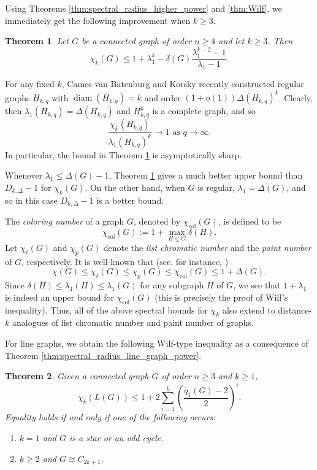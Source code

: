 \documentclass[11pt]{article}
\theoremstyle{plain}
\newtheorem{theorem}{Theorem}[section]
\numberwithin{equation}{section}
\DeclareMathOperator{\diam}{diam}
\DeclareMathOperator{\col}{col}
\begin{document}
Using Theorems \ref{thm:spectral_radius_higher_power} and \ref{thm:Wilf}, we immediately get the following improvement when $k\ge 3$. 

\begin{theorem}\label{thm:wilf_graph_power_improved}
     Let $G$ be a connected graph of order $n\ge 4$ and let $k\ge 3$. Then
     \[\chi_k(G) \le 1 + \lambda_1^k - \delta(G)\frac{\lambda_1^{k-2}-1}{\lambda_1 -1}.\]
\end{theorem}

For any fixed $k$, Cames van Batenburg and Korsky \cite{vanBatenburg_Korsky_2026} recently constructed regular graphs $H_{k,q}$ with $\diam(H_{k,q}) = k$ and order $(1+o(1))\Delta(H_{k,q})^k$. Clearly, then $\lambda_1(H_{k,q}) = \Delta(H_{k,q})$ and $H_{k,q}^k$ is a complete graph, and so 
\[ \frac{\chi_k(H_{k,q})}{\lambda_1(H_{k,q})^k}\to 1 \text{ as }q\to \infty.\]
In particular, the bound in Theorem \ref{thm:wilf_graph_power_improved} is asymptotically sharp.

Whenever $\lambda_1 \le \Delta(G)-1$, Theorem \ref{thm:wilf_graph_power_improved} gives a much better upper bound than $D_{k, \Delta} - 1$ for $\chi_k(G)$. On the other hand, when $G$ is regular, $\lambda_1 = \Delta(G)$, and so in this case $D_{k, \Delta}-1$ is a better bound. 

The \emph{coloring number} of a graph $G$, denoted by $\chi_{\col}(G)$, is defined to be 
\[ \chi_{\col}(G):= 1 + \max_{H\subseteq G}\delta(H).\]
Let $\chi_\ell(G)$ and $\chi_p(G)$ denote the \emph{list chromatic number} and the \emph{paint number} of $G$, respectively. It is well-known that (see, for instance, \cite{Cranston_2023})
\[ \chi(G)\le \chi_\ell(G)\le \chi_p(G)\le \chi_{\col}(G)\le 1 + \Delta(G).\]
Since $\delta(H)\le \lambda_1(H)\le \lambda_1(G)$ for any subgraph $H$ of $G$, we see that $1 + \lambda_1$ is indeed an upper bound for $\chi_{\col}(G)$ (this is precisely the proof of Wilf's inequality). Thus, all of the above spectral bounds for $\chi_k$ also extend to distance-$k$ analogues of list chromatic number and paint number of graphs. 

For line graphs, we obtain the following Wilf-type inequality as a consequence of Theorem \ref{thm:spectral_radius_line_graph_power}. 

\begin{theorem}\label{thm:wilf_line_graph power}
Given a connected graph $G$ of order $n\ge 3$ and $k\ge 1$, 
 \[ \chi_k(L(G))\le 1 + 2\sum_{i=1}^k \left(\frac{q_1(G)-2}{2}\right)^i.\] 
Equality holds if and only if one of the following occurs:
\begin{enumerate}[$(i)$]
    \item $k=1$ and $G$ is a star or an odd cycle. 
    \item $k\ge 2$ and $G\cong C_{2k+1}$. 
\end{enumerate}
\end{theorem}
\end{document}
